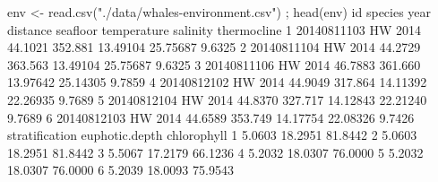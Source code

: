 \documentclass[
]{book}
\newenvironment{Shaded}{\begin{snugshade}}{\end{snugshade}}
\newcommand{\DecValTok}[1]{\textcolor[rgb]{0.00,0.00,0.81}{#1}}
\newcommand{\FloatTok}[1]{\textcolor[rgb]{0.00,0.00,0.81}{#1}}
\newcommand{\FunctionTok}[1]{\textcolor[rgb]{0.00,0.00,0.00}{#1}}
\newcommand{\NormalTok}[1]{#1}
\newcommand{\OtherTok}[1]{\textcolor[rgb]{0.56,0.35,0.01}{#1}}
\newcommand{\StringTok}[1]{\textcolor[rgb]{0.31,0.60,0.02}{#1}}
\begin{document}
\begin{Shaded}
\begin{Highlighting}[]
\NormalTok{env }\OtherTok{\textless{}{-}} \FunctionTok{read.csv}\NormalTok{(}\StringTok{"./data/whales{-}environment.csv"}\NormalTok{) ; }\FunctionTok{head}\NormalTok{(env)}
\NormalTok{           id species year distance seafloor temperature salinity thermocline}
\DecValTok{1} \DecValTok{20140811103}\NormalTok{      HW }\DecValTok{2014}  \FloatTok{44.1021}  \FloatTok{352.881}    \FloatTok{13.49104} \FloatTok{25.75687}      \FloatTok{9.6325}
\DecValTok{2} \DecValTok{20140811104}\NormalTok{      HW }\DecValTok{2014}  \FloatTok{44.2729}  \FloatTok{363.563}    \FloatTok{13.49104} \FloatTok{25.75687}      \FloatTok{9.6325}
\DecValTok{3} \DecValTok{20140811106}\NormalTok{      HW }\DecValTok{2014}  \FloatTok{46.7883}  \FloatTok{361.660}    \FloatTok{13.97642} \FloatTok{25.14305}      \FloatTok{9.7859}
\DecValTok{4} \DecValTok{20140812102}\NormalTok{      HW }\DecValTok{2014}  \FloatTok{44.9049}  \FloatTok{317.864}    \FloatTok{14.11392} \FloatTok{22.26935}      \FloatTok{9.7689}
\DecValTok{5} \DecValTok{20140812104}\NormalTok{      HW }\DecValTok{2014}  \FloatTok{44.8370}  \FloatTok{327.717}    \FloatTok{14.12843} \FloatTok{22.21240}      \FloatTok{9.7689}
\DecValTok{6} \DecValTok{20140812103}\NormalTok{      HW }\DecValTok{2014}  \FloatTok{44.6589}  \FloatTok{353.749}    \FloatTok{14.17754} \FloatTok{22.08326}      \FloatTok{9.7426}
\NormalTok{  stratification euphotic.depth chlorophyll}
\DecValTok{1}         \FloatTok{5.0603}        \FloatTok{18.2951}     \FloatTok{81.8442}
\DecValTok{2}         \FloatTok{5.0603}        \FloatTok{18.2951}     \FloatTok{81.8442}
\DecValTok{3}         \FloatTok{5.5067}        \FloatTok{17.2179}     \FloatTok{66.1236}
\DecValTok{4}         \FloatTok{5.2032}        \FloatTok{18.0307}     \FloatTok{76.0000}
\DecValTok{5}         \FloatTok{5.2032}        \FloatTok{18.0307}     \FloatTok{76.0000}
\DecValTok{6}         \FloatTok{5.2039}        \FloatTok{18.0093}     \FloatTok{75.9543}


\end{Highlighting}
\end{Shaded}
\end{document}
